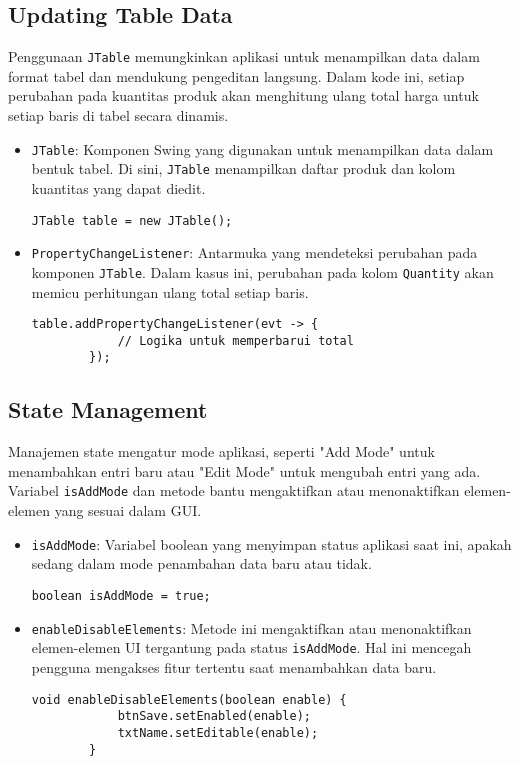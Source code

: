 \subsection{Updating Table Data}

Penggunaan \texttt{JTable} memungkinkan aplikasi untuk menampilkan data dalam format tabel dan mendukung pengeditan langsung. Dalam kode ini, setiap perubahan pada kuantitas produk akan menghitung ulang total harga untuk setiap baris di tabel secara dinamis.

\begin{itemize}
	\item \texttt{JTable}: Komponen Swing yang digunakan untuk menampilkan data dalam bentuk tabel. Di sini, \texttt{JTable} menampilkan daftar produk dan kolom kuantitas yang dapat diedit.
	\begin{lstlisting}[style=JavaStyle]
		JTable table = new JTable();
	\end{lstlisting}
	
	\item \texttt{PropertyChangeListener}: Antarmuka yang mendeteksi perubahan pada komponen \texttt{JTable}. Dalam kasus ini, perubahan pada kolom \texttt{Quantity} akan memicu perhitungan ulang total setiap baris.
	\begin{lstlisting}[style=JavaStyle]
		table.addPropertyChangeListener(evt -> {
			// Logika untuk memperbarui total
		});
	\end{lstlisting}
\end{itemize}

\subsection{State Management}

Manajemen state mengatur mode aplikasi, seperti "Add Mode" untuk menambahkan entri baru atau "Edit Mode" untuk mengubah entri yang ada. Variabel \texttt{isAddMode} dan metode bantu mengaktifkan atau menonaktifkan elemen-elemen yang sesuai dalam GUI.

\begin{itemize}
	\item \texttt{isAddMode}: Variabel boolean yang menyimpan status aplikasi saat ini, apakah sedang dalam mode penambahan data baru atau tidak.
	\begin{lstlisting}[style=JavaStyle]
		boolean isAddMode = true;
	\end{lstlisting}
	
	\item \texttt{enableDisableElements}: Metode ini mengaktifkan atau menonaktifkan elemen-elemen UI tergantung pada status \texttt{isAddMode}. Hal ini mencegah pengguna mengakses fitur tertentu saat menambahkan data baru.
	\begin{lstlisting}[style=JavaStyle]
		void enableDisableElements(boolean enable) {
			btnSave.setEnabled(enable);
			txtName.setEditable(enable);
		}
	\end{lstlisting}
\end{itemize}


